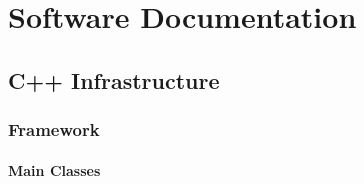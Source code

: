 \section{Software Documentation}

\subsection{C++ Infrastructure}

\subsubsection{Framework}

\paragraph{Main Classes}

